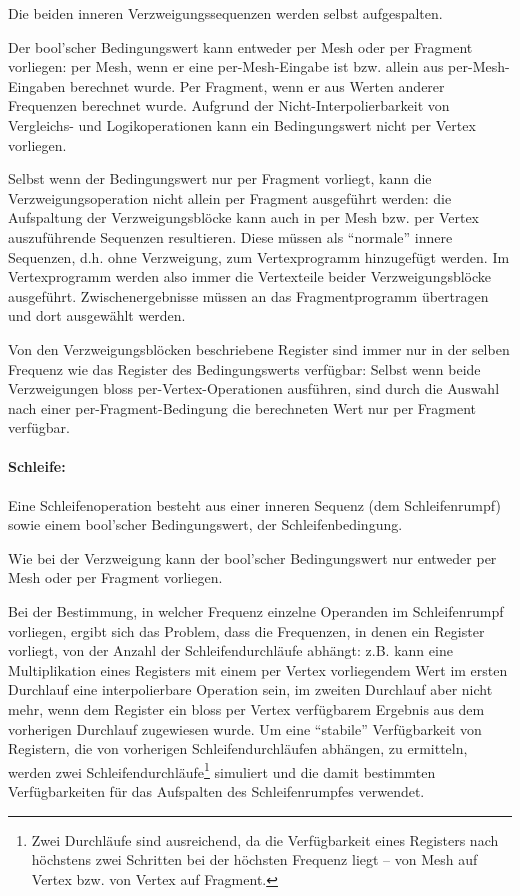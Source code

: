 \documentclass[twoside,a4paper,fleqn,12pt]{book}
\begin{document}
Die beiden inneren Verzweigungssequenzen werden selbst aufgespalten.

Der bool'scher Bedingungswert kann entweder per Mesh oder per Fragment vorliegen: per Mesh, wenn er eine per-Mesh-Eingabe ist bzw. allein aus
per-Mesh-Eingaben berechnet wurde. Per Fragment, wenn er aus Werten anderer Frequenzen berechnet wurde.
Aufgrund der Nicht-Interpolierbarkeit von Vergleichs- und Logikoperationen kann ein Bedingungswert nicht per Vertex vorliegen.

Selbst wenn der Bedingungswert nur per Fragment vorliegt, kann die Verzweigungsoperation nicht allein per Fragment ausgeführt werden:
die Aufspaltung der Verzweigungsblöcke kann auch in per Mesh bzw. per Vertex auszuführende Sequenzen resultieren. Diese müssen als "`normale"'
innere Sequenzen, d.h. ohne Verzweigung, zum Vertexprogramm hinzugefügt werden. Im Vertexprogramm werden also immer
die Vertexteile beider Verzweigungsblöcke ausgeführt. Zwischenergebnisse müssen an das Fragmentprogramm übertragen und dort ausgewählt werden.

Von den Verzweigungsblöcken beschriebene Register sind immer nur in der selben Frequenz wie das Register des Bedingungswerts verfügbar:
Selbst wenn beide Verzweigungen bloss per-Vertex-Operationen ausführen, sind durch die Auswahl nach einer per-Fragment-Bedingung
die berechneten Wert nur per Fragment verfügbar.

\paragraph{Schleife:} Eine Schleifenoperation besteht aus einer inneren Sequenz (dem Schleifenrumpf) sowie
einem bool'scher Bedingungswert, der Schleifenbedingung.

Wie bei der Verzweigung kann der bool'scher Bedingungswert nur entweder per Mesh oder per Fragment vorliegen.

Bei der Bestimmung, in welcher Frequenz einzelne Operanden im Schleifenrumpf vorliegen,
ergibt sich das Problem, dass die Frequenzen, in denen ein Register vorliegt, von der Anzahl der Schleifendurchläufe
abhängt: z.B. kann eine Multiplikation eines Registers mit einem per Vertex vorliegendem Wert im ersten Durchlauf
eine interpolierbare Operation sein, im zweiten Durchlauf aber nicht mehr, wenn dem Register ein bloss per Vertex
verfügbarem Ergebnis aus dem vorherigen Durchlauf zugewiesen wurde.
Um eine "`stabile"' Verfügbarkeit von Registern, die von vorherigen Schleifendurchläufen abhängen, zu ermitteln,
werden zwei Schleifendurchläufe\footnote{Zwei Durchläufe sind ausreichend, da die Verfügbarkeit eines Registers
nach höchstens zwei Schritten bei der höchsten Frequenz liegt -- von Mesh auf Vertex bzw. von Vertex auf Fragment.}
simuliert und die damit bestimmten Verfügbarkeiten für das Aufspalten des Schleifenrumpfes verwendet.
\end{document}
